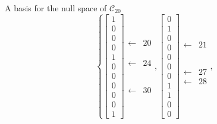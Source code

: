 \documentclass{beamer}
\begin{document}
\begin{frame}{A basis for the null space of $\mathcal{C}_{20}$}
  \[
    \left\{
      \left[\begin{array}{c}
        1 \\ 0 \\ 0 \\ 0 \\ 1 \\ 0 \\ 0 \\ 0 \\ 0 \\ 0 \\ 1
      \end{array}\right]
      \begin{array}{cc}
        \leftarrow & 20 \\ \\ \\ \\
        \leftarrow & 24 \\ \\ \\ \\ \\ \\
        \leftarrow & 30
      \end{array},
      \left[\begin{array}{c}
        0 \\ 1 \\ 0 \\ 0 \\ 0 \\ 0 \\ 0 \\ 1 \\ 1 \\ 0 \\ 0
      \end{array}\right]
       \begin{array}{cc}
        \\ \leftarrow & 21 \\ \\ \\ \\ \\ \\
        \leftarrow & 27 \\ \leftarrow & 28 \\ \\ \\
      \end{array},
\]
\end{frame}
\end{document}
